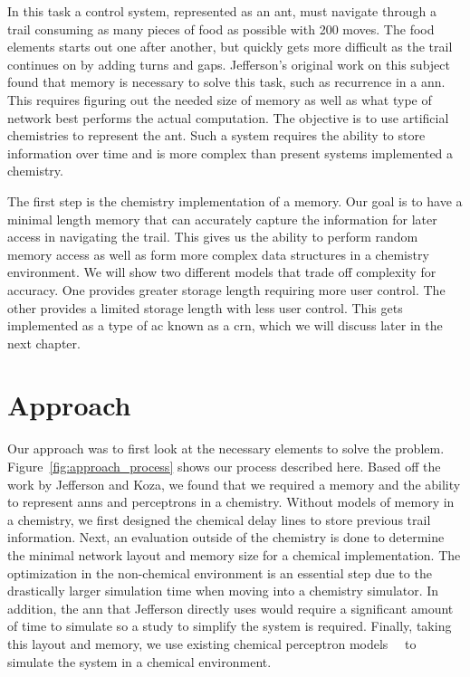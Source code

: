 In this task a control system, represented as an ant, must navigate through a trail consuming as many pieces of food as possible with 200 moves. The food elements starts out one after another, but quickly gets more difficult as the trail continues on by adding turns and gaps. Jefferson's original work on this subject found that memory is necessary to solve this task, such as recurrence in a \gls{ann}. This requires figuring out the needed size of memory as well as what type of network best performs the actual computation.  The objective is to use artificial chemistries to represent the ant. Such a system requires the ability to store information over time and is more complex than present systems implemented a chemistry. 

The first step is the chemistry implementation of a memory. Our goal is to have a minimal length memory that can accurately capture the information for later access in navigating the trail. This gives us the ability to perform random memory access as well as form more complex data structures in a chemistry environment. We will show two different models that trade off complexity for accuracy. One provides greater storage length requiring more user control. The other provides a limited storage length with less user control. This gets implemented as a type of \gls{ac} known as a \gls{crn}, which we will discuss later in the next chapter.

\section{Approach}
Our approach was to first look at the necessary elements to solve the problem. Figure~\ref{fig:approach_process} shows our process described here. Based off the work by Jefferson and Koza, we found that we required a memory and the ability to represent \glspl{ann} and perceptrons in a chemistry. Without models of memory in a chemistry, we first designed the chemical delay lines to store previous trail information. Next, an evaluation outside of the chemistry is done to determine the minimal network layout and memory size for a chemical implementation. The optimization in the non-chemical environment is an essential step due to the drastically larger simulation time when moving into a chemistry simulator. In addition, the \gls{ann} that Jefferson directly uses would require a significant amount of time to simulate so a study to simplify the system is required. Finally, taking this layout and memory, we use existing chemical perceptron models~\cite{Banda2014-kg}~\cite{Blount_undated-ro} to simulate the system in a chemical environment. 

